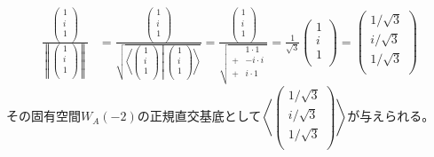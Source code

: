 \documentclass[dvipdfmx]{jsarticle}
\begin{document}
\begin{align*}
\frac{\begin{pmatrix}
1 \\
i \\
1 \\
\end{pmatrix}}{\left\| \begin{pmatrix}
1 \\
i \\
1 \\
\end{pmatrix} \right\|} &= \frac{\begin{pmatrix}
1 \\
i \\
1 \\
\end{pmatrix}}{\sqrt{\left\langle \begin{pmatrix}
1 \\
i \\
1 \\
\end{pmatrix} \middle| \begin{pmatrix}
1 \\
i \\
1 \\
\end{pmatrix} \right\rangle}} = \frac{\begin{pmatrix}
1 \\
i \\
1 \\
\end{pmatrix}}{\sqrt{\begin{matrix}
\  & 1 \cdot 1 \\
 + & - i \cdot i \\
 + & i \cdot 1 \\
\end{matrix}}} = \frac{1}{\sqrt{3}} \begin{pmatrix}
1 \\
i \\
1 \\
\end{pmatrix} = \begin{pmatrix}
{1}/{\sqrt{3}} \\
{i}/{\sqrt{3}} \\
{1}/{\sqrt{3}} \\
\end{pmatrix}
\end{align*}
その固有空間$W_{A}( - 2)$の正規直交基底として$\left\langle \begin{pmatrix}
{1}/{\sqrt{3}} \\
{i}/{\sqrt{3}} \\
{1}/{\sqrt{3}} \\
\end{pmatrix} \right\rangle$が与えられる。\par
\end{document}
